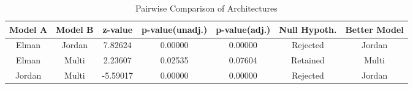 \begin{table}[htbp]
\caption{Pairwise Comparison of Architectures}
\begin{center}
\begin{tabular}{c|c c c c c c}
Model A & Model B & z-value & p-value(unadj.) & p-value(adj.) & Null Hypoth. & Better Model \\
\hline
Elman & Jordan & 7.82624 & 0.00000 & 0.00000 & Rejected & Jordan \\
Elman & Multi & 2.23607 & 0.02535 & 0.07604 & Retained & Multi \\
Jordan & Multi & -5.59017 & 0.00000 & 0.00000 & Rejected & Jordan \\
\end{tabular}
\label{tab_pairwise}
\end{center}
\end{table}